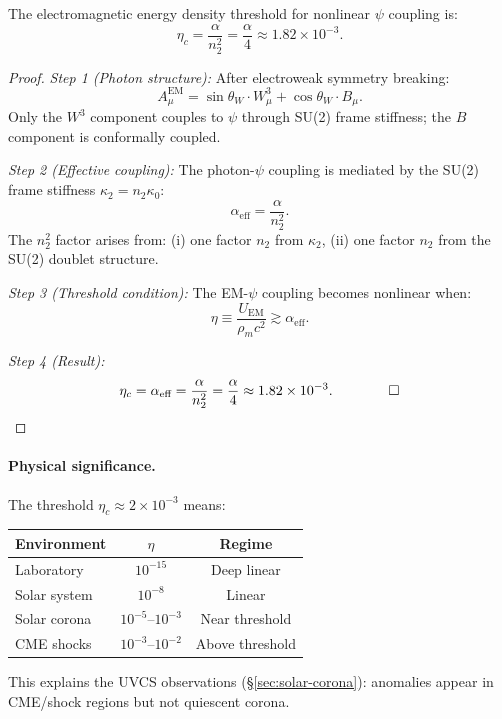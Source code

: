 \begin{theorem}\label{thm:eta}
The electromagnetic energy density threshold for nonlinear $\psi$ coupling is:
\begin{equation}
\eta_c = \frac{\alpha}{n_2^2} = \frac{\alpha}{4} \approx 1.82 \times 10^{-3}.
\end{equation}
\end{theorem}

\begin{proof}
\textit{Step 1 (Photon structure):} After electroweak symmetry breaking:
\begin{equation}
A_\mu^{\text{EM}} = \sin\theta_W \cdot W_\mu^3 + \cos\theta_W \cdot B_\mu.
\end{equation}
Only the $W^3$ component couples to $\psi$ through SU(2) frame stiffness; the $B$ component is conformally coupled.

\textit{Step 2 (Effective coupling):} The photon-$\psi$ coupling is mediated by the SU(2) frame stiffness $\kappa_2 = n_2 \kappa_0$:
\begin{equation}
\alpha_{\text{eff}} = \frac{\alpha}{n_2^2}.
\end{equation}
The $n_2^2$ factor arises from: (i) one factor $n_2$ from $\kappa_2$, (ii) one factor $n_2$ from the SU(2) doublet structure.

\textit{Step 3 (Threshold condition):} The EM-$\psi$ coupling becomes nonlinear when:
\begin{equation}
\eta \equiv \frac{U_{\text{EM}}}{\rho_m c^2} \gtrsim \alpha_{\text{eff}}.
\end{equation}

\textit{Step 4 (Result):}
\begin{equation}
\eta_c = \alpha_{\text{eff}} = \frac{\alpha}{n_2^2} = \frac{\alpha}{4} \approx 1.82 \times 10^{-3}. \qquad \qed
\end{equation}
\end{proof}

\paragraph{Physical significance.}
The threshold $\eta_c \approx 2 \times 10^{-3}$ means:
\begin{center}
\begin{tabular}{lcc}
\toprule
Environment & $\eta$ & Regime \\
\midrule
Laboratory & $10^{-15}$ & Deep linear \\
Solar system & $10^{-8}$ & Linear \\
Solar corona & $10^{-5}$--$10^{-3}$ & Near threshold \\
CME shocks & $10^{-3}$--$10^{-2}$ & Above threshold \\
\bottomrule
\end{tabular}
\end{center}
This explains the UVCS observations (\S\ref{sec:solar-corona}): anomalies appear in CME/shock regions but not quiescent corona.

